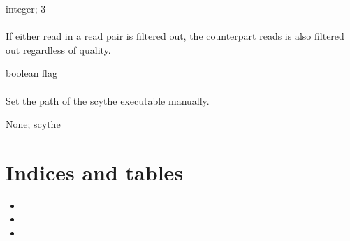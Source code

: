 \documentclass[letterpaper,11pt,english]{sphinxmanual}
\begin{document}
 integer;  3


\subsubsection{}
\label{\detokenize{prog_desc:u-filter-unpaired}}
 If either read in a read pair is filtered out, the counterpart reads is also filtered out regardless of quality.

 boolean flag


\subsubsection{}
\label{\detokenize{prog_desc:x-scythe-executable}}
 Set the path of the scythe executable manually.

 None;  scythe


\chapter{Indices and tables}
\label{\detokenize{index:indices-and-tables}}\begin{itemize}
\item {} 

\item {} 

\item {} 

\end{itemize}



\renewcommand{\indexname}{Index}
\printindex
\end{document}
